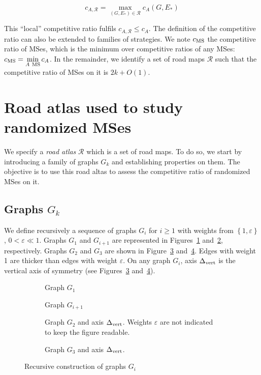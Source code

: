 \documentclass[11pt,letterpaper]{article}
\newcommand{\set}[1]{\left\{ #1 \right\}}
\newcommand{\mts}{MS}
\newcommand{\deltavert}{\Delta_{\mbox{\scriptsize{vert}}}}
\newcommand{\cms}{c_{\mbox{\scriptsize{MS}}}}
\begin{document}
\begin{equation}
c_{A,\mathcal{R}} = \max\limits_{\left(G,E_*\right) \in \mathcal{R}} c_A\left(G,E_*\right)
\end{equation}

This ``local'' competitive ratio fulfils $c_{A,\mathcal{R}} \le c_A$. The definition of the competitive ratio can also be extended to families of strategies. We note $\cms$ the competitive ratio of \mts es, which is the minimum over competitive ratios of any \mts es: $\cms = \min\limits_{A ~\mbox{\scriptsize{\mts}}} c_A$. In the remainder, we identify a set of road maps $\mathcal{R}$ such that the competitive ratio of \mts es on it is $2k+O\left(1\right)$.

\section{Road atlas used to study randomized \mts es} \label{sec:roadatlas}

We specify a \textit{road atlas} $\mathcal{R}$ which is a set of road maps. To do so, we start by introducing a family of graphs $G_k$ and establishing properties on them. The objective is to use this road altas to assess the competitive ratio of randomized \mts es on it.

\subsection{Graphs $G_k$} \label{subsec:Gk}

We define recursively a sequence of graphs $G_i$ for $i \geq 1$ with weights from $\set{1,\varepsilon}$, $0 < \varepsilon \ll 1$. Graphs $G_1$ and $G_{i+1}$ are represented in Figures~\ref{subfig:G_1} and~\ref{subfig:G_i}, respectively. Graphs $G_2$ and $G_3$ are shown in Figure~\ref{subfig:G_2} and~\ref{subfig:G_3}. Edges with weight 1 are thicker than edges with weight $\varepsilon$. On any graph $G_i$, axis $\deltavert$ is the vertical axis of symmetry (see Figures~\ref{subfig:G_2} and~\ref{subfig:G_3}).

\begin{figure}[h]
\centering
\begin{subfigure}[b]{0.49\columnwidth}
\centering
\scalebox{.7}{}
\caption{Graph $G_1$}
\label{subfig:G_1}
\end{subfigure}
\begin{subfigure}[b]{0.49\columnwidth}
\centering
\scalebox{.52}{}
\caption{Graph $G_{i+1}$}
\label{subfig:G_i}
\end{subfigure}
\begin{subfigure}[b]{0.49\columnwidth}
\centering
\scalebox{.45}{}
\caption{Graph $G_2$ and axis $\deltavert$. Weights $\varepsilon$ are not indicated to keep the figure readable.}
\label{subfig:G_2}
\end{subfigure}
\begin{subfigure}[b]{0.49\columnwidth}
\centering
\scalebox{0.45}{}
\caption{Graph $G_3$ and axis $\deltavert$. }
\label{subfig:G_3}
\end{subfigure}
\caption{Recursive construction of graphs $G_i$}
\label{fig:G_i}
\end{figure}
\end{document}
